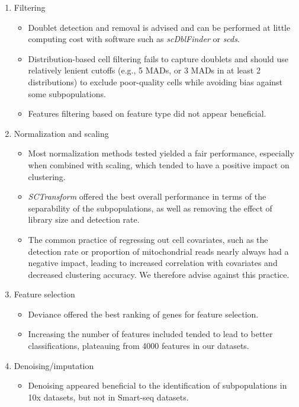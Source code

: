 \documentclass{bmcart}
\begin{document}
\begin{enumerate}
   \item Filtering
   \begin{itemize}
     \item Doublet detection and removal is advised and can be performed at little computing cost with software such as \textit{scDblFinder} or \textit{scds}.
     \item Distribution-based cell filtering fails to capture doublets and should use relatively lenient cutoffs (e.g., 5 MADs, or 3 MADs in at least 2 distributions) to exclude poor-quality cells while avoiding bias against some subpopulations.
     \item Features filtering based on feature type did not appear beneficial.
   \end{itemize}
   \item Normalization and scaling
   \begin{itemize}
     \item Most normalization methods tested yielded a fair performance, especially when combined with scaling, which tended to have a positive impact on clustering.
     \item \textit{SCTransform} offered the best overall performance in terms of the separability of the subpopulations, as well as removing the effect of library size and detection rate.
     \item The common practice of regressing out cell covariates, such as the detection rate or proportion of mitochondrial reads nearly always had a negative impact, leading to increased correlation with covariates and decreased clustering accuracy. We therefore advise against this practice.
   \end{itemize}
   \item Feature selection
   \begin{itemize}
     \item Deviance \cite{townesGlmpca2019} offered the best ranking of genes for feature selection.
     \item Increasing the number of features included tended to lead to better classifications, plateauing from 4000 features in our datasets.
   \end{itemize}
   \item Denoising/imputation
   \begin{itemize}
       \item Denoising appeared beneficial to the identification of subpopulations in 10x datasets, but not in Smart-seq datasets.

\end{itemize}
\end{enumerate}
\end{document}
